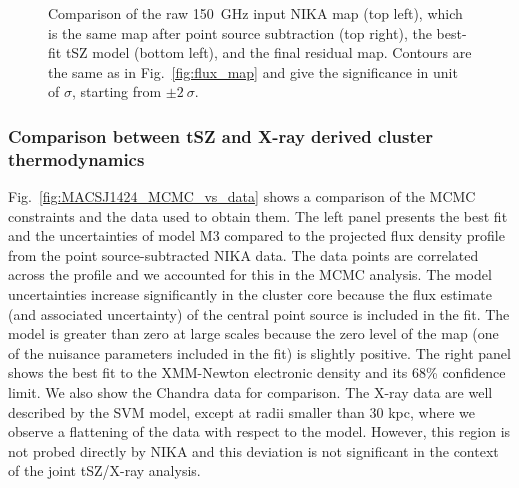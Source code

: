 \documentclass[traditabstract]{aa}
\begin{document}
\begin{figure}[h]
\caption{\footnotesize Comparison of the raw 150~GHz input NIKA map (top left), which is the same map after point source subtraction (top right), the best-fit tSZ model (bottom left), and the final residual map. Contours are the same as in Fig.~\ref{fig:flux_map} and give the significance in unit of $\sigma$, starting from $\pm 2 \ \sigma$. }
\label{fig:MACSJ1424_MCMC_modeling}
\end{figure}

\subsubsection{Comparison between tSZ and X-ray derived cluster thermodynamics}
Fig.~\ref{fig:MACSJ1424_MCMC_vs_data} shows a comparison of the MCMC constraints and the data used to obtain them. The left panel presents the best fit and the uncertainties of model M3 compared to the projected flux density profile from the point source-subtracted NIKA data. The data points are correlated across the profile and we accounted for this in the MCMC analysis. The model uncertainties increase significantly in the cluster core because the flux estimate (and associated uncertainty) of the central point source is included in the fit. The model is greater than zero at large scales because the zero level of the map (one of the nuisance parameters included in the fit) is slightly positive. The right panel shows the best fit to the XMM-Newton electronic density and its 68\% confidence limit. We also show the Chandra data for comparison. The X-ray data are well described by the SVM model, except at radii smaller than 30 kpc, where we observe a flattening of the data with respect to the model. However, this region is not probed directly by NIKA and this deviation is not significant in the context of the joint tSZ/X-ray analysis.
\end{document}
